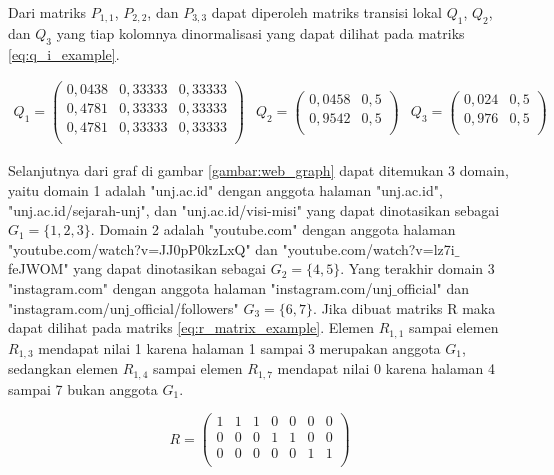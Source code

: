 Dari matriks $P_{1,1}$, $P_{2,2}$, dan $P_{3,3}$ dapat diperoleh matriks transisi lokal $Q_1$, $Q_2$, dan $Q_3$ yang tiap kolomnya dinormalisasi yang dapat dilihat pada matriks \ref{eq:q_i_example}.

\begingroup
\makeatletter
\def\f@size{10}
\check@mathfonts
\begin{align}
\label{eq:q_i_example}
	Q_1 =
	\begin{pmatrix}
		0,0438 & 0,33333 & 0,33333 \\
		0,4781 & 0,33333 & 0,33333 \\
		0,4781 & 0,33333 & 0,33333 \\
	\end{pmatrix} &
	Q_2 =
	\begin{pmatrix}
		0,0458 & 0,5 \\
		0,9542 & 0,5 \\
	\end{pmatrix} &
	Q_3 =
	\begin{pmatrix}
		0,024 & 0,5 \\
		0,976 & 0,5 \\
	\end{pmatrix}
\end{align}
\endgroup

Selanjutnya dari graf di gambar \ref{gambar:web_graph} dapat ditemukan 3 domain, yaitu domain 1 adalah "unj.ac.id" dengan anggota halaman "unj.ac.id", "unj.ac.id/sejarah-unj", dan "unj.ac.id/visi-misi" yang dapat dinotasikan sebagai $G_1 = \{1, 2, 3\}$. Domain 2 adalah "youtube.com" dengan anggota halaman "youtube.com/watch?v=JJ0pP0kzLxQ" dan "youtube.com/watch?v=lz7i$\_$feJWOM" yang dapat dinotasikan sebagai $G_2 = \{4, 5\}$. Yang terakhir domain 3 "instagram.com" dengan anggota halaman "instagram.com/unj$\_$official" dan "instagram.com/unj$\_$official/followers" $G_3 = \{6, 7\}$. Jika dibuat matriks R maka dapat dilihat pada matriks \ref{eq:r_matrix_example}. Elemen $R_{1,1}$ sampai elemen $R_{1,3}$ mendapat nilai 1 karena halaman 1 sampai 3 merupakan anggota $G_1$, sedangkan elemen $R_{1,4}$ sampai elemen $R_{1,7}$ mendapat nilai 0 karena halaman 4 sampai 7 bukan anggota $G_1$.

\begin{equation}
\label{eq:r_matrix_example}
	R =
	\begin{pmatrix}
		1 & 1 & 1 & 0 & 0 & 0 & 0 \\
		0 & 0 & 0 & 1 & 1 & 0 & 0 \\
		0 & 0 & 0 & 0 & 0 & 1 & 1 \\
	\end{pmatrix}
\end{equation}

